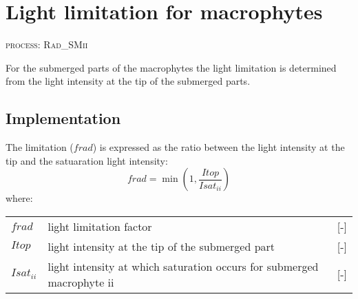 \section{Light limitation for macrophytes}
\begin{flushright}
\textsc{process: Rad\_SMii}
\end{flushright}

For the submerged parts of the macrophytes the light limitation is determined from the light intensity at
the tip of the submerged parts.

\subsection*{Implementation}
The limitation ($frad$) is expressed as the ratio between the light intensity at the tip and the satuaration
light intensity:
%
\begin{equation}
   frad = \min( 1, \frac{Itop}{Isat_{ii}} )
\end{equation}
%
where:

\begin{tabular}{lll}
$frad$        & light limitation factor                                                 & [-] \\
$Itop$        & light intensity at the tip of the submerged part                        & [-] \\
$Isat_{ii}$ & light intensity at which saturation occurs for submerged macrophyte ii  & [-] \\
\end{tabular}
